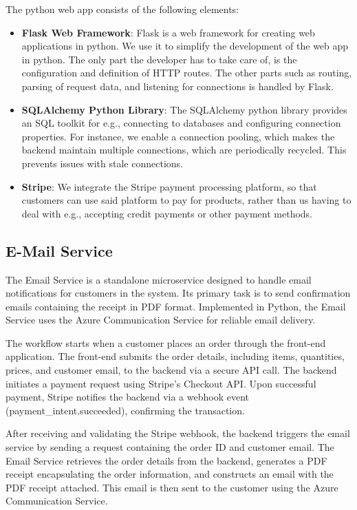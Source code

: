 The python web app consists of the following elements:

\begin{itemize}
    \item \textbf{Flask Web Framework}: Flask is a web framework for creating web applications in python.
    We use it to simplify the development of the web app in python.
    The only part the developer has to take care of, is the configuration and definition of HTTP routes.
    The other parts such as routing, parsing of request data, and listening for connections is handled by Flask.
    \item \textbf{SQLAlchemy Python Library}: The SQLAlchemy python library provides an SQL toolkit for e.g., 
    connecting to databases and configuring connection properties.
    For instance, we enable a connection pooling, which makes the backend maintain multiple connections,
    which are periodically recycled. This prevents issues with stale connections.
    \item \textbf{Stripe}: We integrate the Stripe payment processing platform, so that customers can use said platform
    to pay for products, rather than us having to deal with e.g., 
    accepting credit payments or other payment methods.
\end{itemize}

\subsection{E-Mail Service}
The Email Service is a standalone microservice designed to handle email notifications for customers in the system. Its primary task is to send confirmation emails containing the receipt in PDF format. Implemented in Python, the Email Service uses the Azure Communication Service for reliable email delivery.

The workflow starts when a customer places an order through the front-end application. The front-end submits the order details, including items, quantities, prices, and customer email, to the backend via a secure API call. The backend initiates a payment request using Stripe's Checkout API. Upon successful payment, Stripe notifies the backend via a webhook event (payment\_intent.succeeded), confirming the transaction.

After receiving and validating the Stripe webhook, the backend triggers the email service by sending a request containing the order ID and customer email. The Email Service retrieves the order details from the backend, generates a PDF receipt encapsulating the order information, and constructs an email with the PDF receipt attached. This email is then sent to the customer using the Azure Communication Service.

